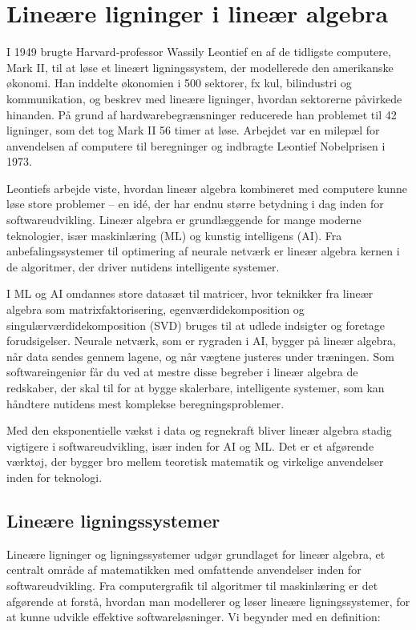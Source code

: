 \chapter{Lineære ligninger i lineær algebra}\label{chap:ch7}

I 1949 brugte Harvard-professor Wassily Leontief en af de tidligste computere, Mark II, til at løse et lineært ligningssystem, der modellerede den amerikanske økonomi. Han inddelte økonomien i 500 sektorer, fx kul, bilindustri og kommunikation, og beskrev med lineære ligninger, hvordan sektorerne påvirkede hinanden. På grund af hardwarebegrænsninger reducerede han problemet til 42 ligninger, som det tog Mark II 56 timer at løse. Arbejdet var en milepæl for anvendelsen af computere til beregninger og indbragte Leontief Nobelprisen i 1973.

Leontiefs arbejde viste, hvordan lineær algebra kombineret med computere kunne løse store problemer -- en idé, der har endnu større betydning i dag inden for softwareudvikling. Lineær algebra er grundlæggende for mange moderne teknologier, især maskinlæring (ML) og kunstig intelligens (AI). Fra anbefalingssystemer til optimering af neurale netværk er lineær algebra kernen i de algoritmer, der driver nutidens intelligente systemer.

I ML og AI omdannes store datasæt til matricer, hvor teknikker fra lineær algebra som matrixfaktorisering, egenværdidekomposition og singulærværdidekomposition (SVD) bruges til at udlede indsigter og foretage forudsigelser. Neurale netværk, som er rygraden i AI, bygger på lineær algebra, når data sendes gennem lagene, og når vægtene justeres under træningen. Som softwareingeniør får du ved at mestre disse begreber i lineær algebra de redskaber, der skal til for at bygge skalerbare, intelligente systemer, som kan håndtere nutidens mest komplekse beregningsproblemer.

Med den eksponentielle vækst i data og regnekraft bliver lineær algebra stadig vigtigere i softwareudvikling, især inden for AI og ML. Det er et afgørende værktøj, der bygger bro mellem teoretisk matematik og virkelige anvendelser inden for teknologi.

\section{Lineære ligningssystemer}

Lineære ligninger og ligningssystemer udgør grundlaget for lineær algebra, et centralt område af matematikken med omfattende anvendelser inden for softwareudvikling. Fra computergrafik til algoritmer til maskinlæring er det afgørende at forstå, hvordan man modellerer og løser lineære ligningssystemer, for at kunne udvikle effektive softwareløsninger. Vi begynder med en definition:

